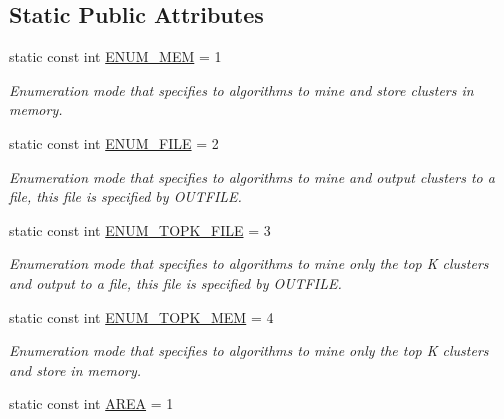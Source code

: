 \subsection*{Static Public Attributes}
\begin{DoxyCompactItemize}
\item 
\hypertarget{class_lattice_algos_a80df6360d3246d74ae31e51e6c4bfa0e}{
static const int \hyperlink{class_lattice_algos_a80df6360d3246d74ae31e51e6c4bfa0e}{ENUM\_\-MEM} = 1}
\label{class_lattice_algos_a80df6360d3246d74ae31e51e6c4bfa0e}

\begin{DoxyCompactList}\small\item\em Enumeration mode that specifies to algorithms to mine and store clusters in memory. \item\end{DoxyCompactList}\item 
\hypertarget{class_lattice_algos_a824804a33640782553f2b399b28fde13}{
static const int \hyperlink{class_lattice_algos_a824804a33640782553f2b399b28fde13}{ENUM\_\-FILE} = 2}
\label{class_lattice_algos_a824804a33640782553f2b399b28fde13}

\begin{DoxyCompactList}\small\item\em Enumeration mode that specifies to algorithms to mine and output clusters to a file, this file is specified by OUTFILE. \item\end{DoxyCompactList}\item 
\hypertarget{class_lattice_algos_a04a0ea3a71c5b598242fa4ec3d4fce79}{
static const int \hyperlink{class_lattice_algos_a04a0ea3a71c5b598242fa4ec3d4fce79}{ENUM\_\-TOPK\_\-FILE} = 3}
\label{class_lattice_algos_a04a0ea3a71c5b598242fa4ec3d4fce79}

\begin{DoxyCompactList}\small\item\em Enumeration mode that specifies to algorithms to mine only the top K clusters and output to a file, this file is specified by OUTFILE. \item\end{DoxyCompactList}\item 
\hypertarget{class_lattice_algos_a1c6a4b5dce3ccade9e17ce4b2a6afbe7}{
static const int \hyperlink{class_lattice_algos_a1c6a4b5dce3ccade9e17ce4b2a6afbe7}{ENUM\_\-TOPK\_\-MEM} = 4}
\label{class_lattice_algos_a1c6a4b5dce3ccade9e17ce4b2a6afbe7}

\begin{DoxyCompactList}\small\item\em Enumeration mode that specifies to algorithms to mine only the top K clusters and store in memory. \item\end{DoxyCompactList}\item 
\hypertarget{class_lattice_algos_a0a79ddaab00906dea5756ac05a4861a5}{
static const int \hyperlink{class_lattice_algos_a0a79ddaab00906dea5756ac05a4861a5}{AREA} = 1}
\label{class_lattice_algos_a0a79ddaab00906dea5756ac05a4861a5}


\end{DoxyCompactItemize}
